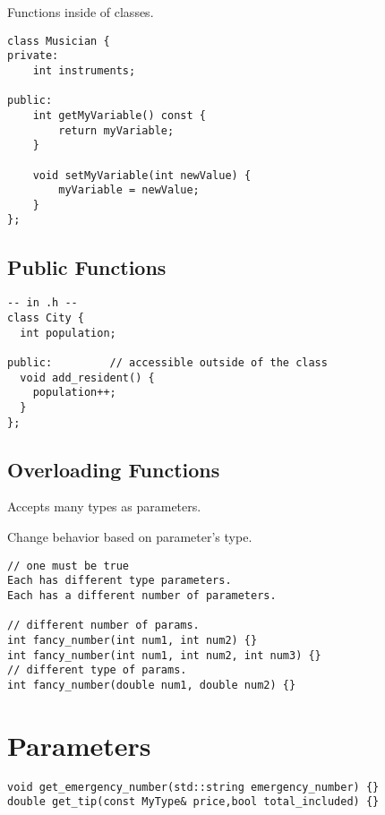 Functions inside of classes.

\begin{verbatim}
class Musician {
private:
    int instruments;

public:
    int getMyVariable() const {
        return myVariable;
    }

    void setMyVariable(int newValue) {
        myVariable = newValue;
    }
};
\end{verbatim}

\subsection{Public Functions}

\begin{verbatim}
-- in .h --
class City {
  int population; 
 
public:         // accessible outside of the class
  void add_resident() { 
    population++;
  }
};
\end{verbatim}

\subsection{Overloading Functions}

Accepts many types as parameters.

Change behavior based on parameter's type.

\begin{verbatim}
// one must be true
Each has different type parameters.
Each has a different number of parameters.
    
// different number of params.
int fancy_number(int num1, int num2) {}
int fancy_number(int num1, int num2, int num3) {}
// different type of params.
int fancy_number(double num1, double num2) {}
\end{verbatim}

\section{Parameters}

\begin{verbatim}
void get_emergency_number(std::string emergency_number) {}
double get_tip(const MyType& price,bool total_included) {}
\end{verbatim}

